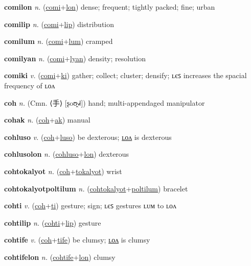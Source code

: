 \textbf{\hypertarget{comilon}{comilon}} \textit{n.} (\hyperlink{comi}{comi}+\allowbreak \hyperlink{lon}{lon})
dense; frequent; tightly packed; fine; urban

\textbf{\hypertarget{comilip}{comilip}} \textit{n.} (\hyperlink{comi}{comi}+\allowbreak \hyperlink{lip}{lip})
distribution

\textbf{\hypertarget{comilum}{comilum}} \textit{n.} (\hyperlink{comi}{comi}+\allowbreak \hyperlink{lum}{lum})
cramped

\textbf{\hypertarget{comilyan}{comilyan}} \textit{n.} (\hyperlink{comi}{comi}+\allowbreak \hyperlink{lyan}{lyan})
density; resolution

\textbf{\hypertarget{comiki}{comiki}} \textit{v.} (\hyperlink{comi}{comi}+\allowbreak \hyperlink{ki}{ki})
gather; collect; cluster; densify; ʟєꜱ increases the spacial frequency of ʟᴏᴧ

\textbf{\hypertarget{coh}{coh}} \textit{n.} (Cmn. ⟨{\chinese{}手}⟩ [ʂoʊ̯˧˩˧])
hand; multi-appendaged manipulator

\textbf{\hypertarget{cohak}{cohak}} \textit{n.} (\hyperlink{coh}{coh}+\allowbreak \hyperlink{ak}{ak})
manual

\textbf{\hypertarget{cohluso}{cohluso}} \textit{v.} (\hyperlink{coh}{coh}+\allowbreak \hyperlink{luso}{luso})
be dexterous; \hyperlink{cohlusolon}{ʟᴏᴧ} is dexterous

\textbf{\hypertarget{cohlusolon}{cohlusolon}} \textit{n.} (\hyperlink{cohluso}{cohluso}+\allowbreak \hyperlink{lon}{lon})
dexterous

\textbf{\hypertarget{cohtokalyot}{cohtokalyot}} \textit{n.} (\hyperlink{coh}{coh}+\allowbreak \hyperlink{tokalyot}{tokalyot})
wrist

\textbf{\hypertarget{cohtokalyotpoltilum}{cohtokalyotpoltilum}} \textit{n.} (\hyperlink{cohtokalyot}{cohtokalyot}+\allowbreak \hyperlink{poltilum}{poltilum})
bracelet

\textbf{\hypertarget{cohti}{cohti}} \textit{v.} (\hyperlink{coh}{coh}+\allowbreak \hyperlink{ti}{ti})
gesture; sign; ʟєꜱ gestures ʟᴜᴍ to ʟᴏᴧ

\textbf{\hypertarget{cohtilip}{cohtilip}} \textit{n.} (\hyperlink{cohti}{cohti}+\allowbreak \hyperlink{lip}{lip})
gesture

\textbf{\hypertarget{cohtife}{cohtife}} \textit{v.} (\hyperlink{coh}{coh}+\allowbreak \hyperlink{tife}{tife})
be clumsy; \hyperlink{cohtifelon}{ʟᴏᴧ} is clumsy

\textbf{\hypertarget{cohtifelon}{cohtifelon}} \textit{n.} (\hyperlink{cohtife}{cohtife}+\allowbreak \hyperlink{lon}{lon})
clumsy

